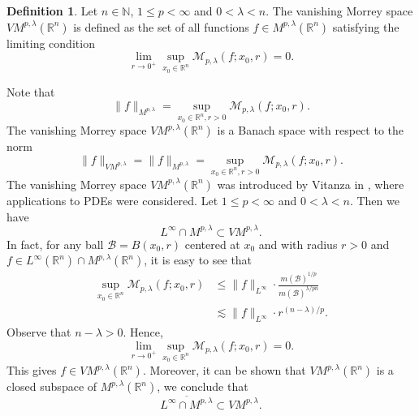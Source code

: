 \documentclass[10pt, reqno]{amsart}
\theoremstyle{definition}
\newtheorem{definition}[theorem]{Definition}
\theoremstyle{remark}
\numberwithin{equation}{section}
\begin{document}
\begin{definition}
Let $n\in \mathbb{N}$, $1\leq p<\infty$ and $0<\lambda<n$. The vanishing Morrey space $VM^{p,\lambda}(\mathbb R^n)$ is defined as the set of all functions $f\in M^{p,\lambda}(\mathbb R^n)$ satisfying the limiting condition
\begin{equation*}
\lim_{r\to 0^{+}}\sup_{x_0\in \mathbb R^n}\mathcal{M}_{p,\lambda}(f;x_0,r)=0.
\end{equation*}
\end{definition}
Note that
\begin{equation*}
\big\|f\big\|_{{M}^{p,\lambda}}=\sup_{x_0\in \mathbb R^n,r>0}\mathcal{M}_{p,\lambda}(f;x_0,r).
\end{equation*}
The vanishing Morrey space $VM^{p,\lambda}(\mathbb R^n)$ is a Banach space with respect to the norm
\begin{equation*}
\big\|f\big\|_{VM^{p,\lambda}}=\big\|f\big\|_{{M}^{p,\lambda}}=\sup_{x_0\in \mathbb R^n,r>0}\mathcal{M}_{p,\lambda}(f;x_0,r).
\end{equation*}
The vanishing Morrey space $VM^{p,\lambda}(\mathbb R^n)$ was introduced by Vitanza in \cite{vitanza}, where applications to PDEs were considered. Let $1\leq p<\infty$ and $0<\lambda<n$. Then we have
\begin{equation*}
L^{\infty}\cap M^{p,\lambda}\subset VM^{p,\lambda}.
\end{equation*}
In fact, for any ball $\mathcal{B}=B(x_0,r)$ centered at $x_0$ and with radius $r>0$ and $f\in L^{\infty}(\mathbb R^n)\cap M^{p,\lambda}(\mathbb R^n)$, it is easy to see that
\begin{equation*}
\begin{split}
\sup_{x_0\in \mathbb R^n}\mathcal{M}_{p,\lambda}(f;x_0,r)
&\leq\|f\|_{L^{\infty}}\cdot\frac{m(\mathcal{B})^{1/p}}{m(\mathcal{B})^{\lambda/{pn}}}\\
&\lesssim\|f\|_{L^{\infty}}\cdot r^{{(n-\lambda)}/p}.
\end{split}
\end{equation*}
Observe that $n-\lambda>0$. Hence,
\begin{equation*}
\lim_{r\to 0^{+}}\sup_{x_0\in \mathbb R^n}\mathcal{M}_{p,\lambda}(f;x_0,r)=0.
\end{equation*}
This gives $f\in VM^{p,\lambda}(\mathbb R^n)$. Moreover, it can be shown that $VM^{p,\lambda}(\mathbb R^n)$ is a closed subspace of $M^{p,\lambda}(\mathbb R^n)$, we conclude that
\begin{equation*}
\overline{L^{\infty}\cap M^{p,\lambda}}\subset VM^{p,\lambda}.
\end{equation*}
\end{document}
